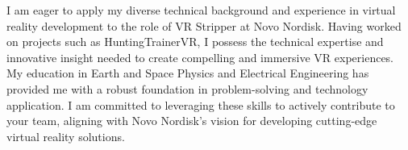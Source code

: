 
I am eager to apply my diverse technical background and experience in virtual reality development to the role of VR Stripper at Novo Nordisk.
 Having worked on projects such as HuntingTrainerVR, I possess the technical expertise and innovative insight needed to create compelling and immersive VR experiences.
 My education in Earth and Space Physics and Electrical Engineering has provided me with a robust foundation in problem-solving and technology application.
 I am committed to leveraging these skills to actively contribute to your team, aligning with Novo Nordisk's vision for developing cutting-edge virtual reality solutions.

